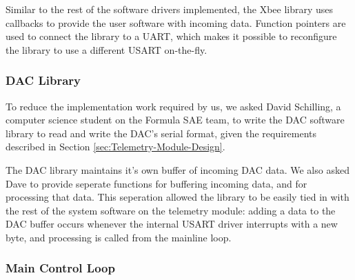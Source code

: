 Similar to the rest of the software drivers implemented, the Xbee library uses callbacks to provide the user software with incoming data. Function pointers are used to connect the library to a UART, which makes it possible to reconfigure the library to use a different USART on-the-fly.

\subsubsection{DAC Library}

To reduce the implementation work required by us, we asked David Schilling, a computer science student on the Formula SAE team, to write the DAC software library to read and write the DAC's serial format, given the requirements described in Section \ref{sec:Telemetry-Module-Design}.

The DAC library maintains it's own buffer of incoming DAC data. We also asked Dave to provide seperate functions for buffering incoming data, and for processing that data. This seperation allowed the library to be easily tied in with the rest of the system software on the telemetry module: adding a data to the DAC buffer occurs whenever the internal USART driver interrupts with a new byte, and processing is called from the mainline loop.

\subsubsection{Main Control Loop}